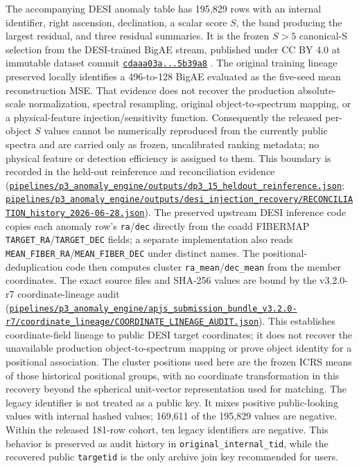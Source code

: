 \documentclass[twocolumn,linenumbers]{aastex702}
\newcommand{\repoBase}{https://github.com/Hubify-Projects/bigbounce/blob/main}
\newcommand{\artifact}[1]{\href{\repoBase/#1}{\nolinkurl{#1}}}
\newcommand{\bundleVersion}{v3.2.0-r7}
\begin{document}
The accompanying DESI anomaly table has 195,829 rows with an internal identifier, right
ascension, declination, a scalar score $S$, the band producing the largest residual, and three
residual summaries.  It is the frozen $S>5$ canonical-S selection from the DESI-trained BigAE
stream, published under CC BY 4.0 at immutable dataset commit
\href{https://huggingface.co/datasets/bamfai/bigbounce-anomaly-catalog/tree/cdaaa03a72c69d86f011be128d93f261dc5b39a8}{\texttt{cdaaa03a...5b39a8}} \citep{Golden2026Data}.  The original
training lineage preserved locally identifies a 496-to-128 BigAE evaluated as the five-seed mean
reconstruction MSE.  That evidence does not recover the production absolute-scale normalization,
spectral resampling, original object-to-spectrum mapping, or a physical-feature injection/sensitivity
function.  Consequently the released per-object $S$ values cannot be numerically reproduced from
the currently public spectra and are carried only as frozen, uncalibrated ranking metadata; no
physical feature or detection efficiency is assigned to them.  This boundary is recorded in the
held-out reinference and reconciliation evidence
(\artifact{pipelines/p3\_anomaly\_engine/outputs/dp3\_15\_heldout\_reinference.json};
\artifact{pipelines/p3\_anomaly\_engine/outputs/desi\_injection\_recovery/RECONCILIATION\_history\_2026-06-28.json}).
The preserved upstream DESI inference code copies each anomaly row's \texttt{ra}/\texttt{dec}
directly from the coadd FIBERMAP \texttt{TARGET\_RA}/\texttt{TARGET\_DEC} fields; a separate
implementation also reads \texttt{MEAN\_FIBER\_RA}/\texttt{MEAN\_FIBER\_DEC} under distinct names.
The positional-deduplication code then computes cluster \texttt{ra\_mean}/\texttt{dec\_mean} from
the member coordinates.  The exact source files and SHA-256 values are bound by the \bundleVersion{}
coordinate-lineage audit
(\artifact{pipelines/p3\_anomaly\_engine/apjs\_submission\_bundle\_v3.2.0-r7/coordinate\_lineage/COORDINATE\_LINEAGE\_AUDIT.json}).
This establishes coordinate-field lineage to public DESI target coordinates; it does not recover
the unavailable production object-to-spectrum mapping or prove object identity for a positional
association.  The cluster positions used here are the frozen ICRS means of those historical
positional groups, with no coordinate transformation in this recovery beyond the spherical
unit-vector representation used for matching.  The legacy
identifier is not treated as a public key.  It mixes positive
public-looking values with internal hashed values; 169,611 of the 195,829 values are negative.
Within the released 181-row cohort, ten legacy identifiers are negative.  This behavior is
preserved as audit history in \texttt{original\_internal\_tid}, while the recovered public
\texttt{targetid} is the only archive join key recommended for users.
\end{document}
